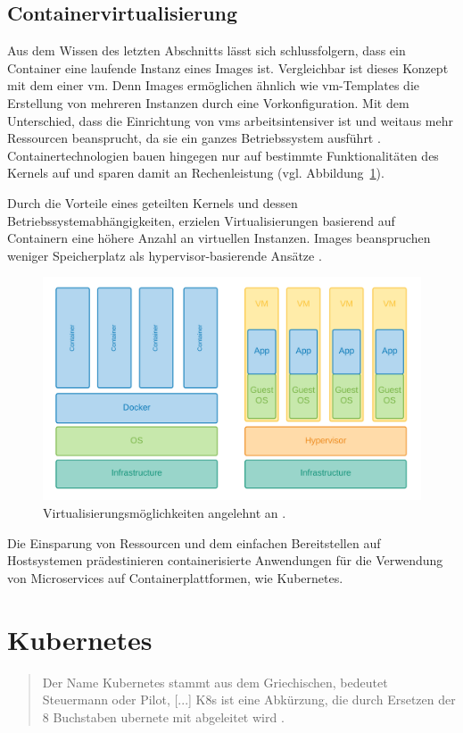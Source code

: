 \subsection{Containervirtualisierung}
Aus dem Wissen des letzten Abschnitts lässt sich schlussfolgern, dass
ein Container eine laufende Instanz eines Images ist.
Vergleichbar ist dieses Konzept mit dem einer \acs{vm}.
Denn Images ermöglichen ähnlich wie \acs{vm}-Templates die Erstellung von mehreren Instanzen durch eine Vorkonfiguration.
Mit dem Unterschied, dass die Einrichtung von \acs{vm}s arbeitsintensiver ist und weitaus mehr Ressourcen
beansprucht, da sie ein ganzes Betriebssystem ausführt \cite{hypervisorcontainer}. Containertechnologien bauen hingegen nur auf 
bestimmte Funktionalitäten des Kernels auf und sparen damit an Rechenleistung (vgl. Abbildung~\ref{fig:containervm}).

Durch die Vorteile eines geteilten Kernels und dessen Betriebssystemabhängigkeiten,
erzielen Virtualisierungen basierend auf Containern eine höhere Anzahl an 
virtuellen Instanzen. Images beanspruchen weniger Speicherplatz als hypervisor-basierende Ansätze \cite{hypervisorcontainer}.

\begin{figure}
    \centering
    \includegraphics[width=1.0\columnwidth]{images/Container-VM.png}
    \caption{Virtualisierungsmöglichkeiten angelehnt an \protect\cite{containervsvm}.}
    \label{fig:containervm}
\end{figure}

Die Einsparung von Ressourcen und dem einfachen Bereitstellen auf Hostsystemen
prädestinieren containerisierte Anwendungen für die Verwendung von Microservices
auf Containerplattformen, wie Kubernetes.


\section{Kubernetes}
\begin{quote}
  \glqq Der Name Kubernetes stammt aus dem Griechischen, bedeutet Steuermann oder Pilot, [...]
K8s ist eine Abkürzung, die durch Ersetzen der 8 Buchstaben \dq ubernete\dq{} mit \dq{} abgeleitet wird\grqq{} \cite{kubernetes}.
\end{quote}


